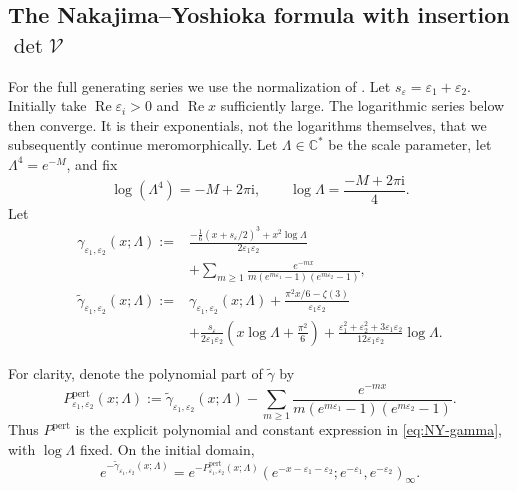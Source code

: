 \documentclass{amsart}
\theoremstyle{definition}
\numberwithin{equation}{section}
\newcommand{\C}{\mathbb C}
\newcommand{\eps}{\varepsilon}
\begin{document}
\subsection{The Nakajima--Yoshioka formula with insertion \texorpdfstring{\(\det\mathcal V\)}{det V}}
\label{subsec:NY-P2-level-one}
For the full generating series we use the normalization of \cite{NakajimaYoshiokaPerverse}.  Let \(s_\eps=\eps_1+\eps_2\).  Initially take \(\operatorname{Re}\eps_i>0\) and \(\operatorname{Re}x\) sufficiently large.  The logarithmic series below then converge.  It is their exponentials, not the logarithms themselves, that we subsequently continue meromorphically.  Let \(\Lambda\in\C^*\) be the scale parameter, let \(\Lambda^4=e^{-M}\), and fix
\begin{equation}
 \log(\Lambda^4)=-M+2\pi\mathrm{i},
 \qquad \log\Lambda=\frac{-M+2\pi\mathrm{i}}{4}.
\label{eq:Lambda-continuation-branch}
\end{equation}
Let
\begin{equation}
\begin{aligned}
 \gamma_{\eps_1,\eps_2}(x;\Lambda)
 :={}&
 \frac{-\frac16(x+s_\eps/2)^3+x^2\log\Lambda}
 {2\eps_1\eps_2}\\
 &+\sum_{m\geq1}
 \frac{e^{-mx}}
 {m(e^{m\eps_1}-1)(e^{m\eps_2}-1)},\\
 \widetilde\gamma_{\eps_1,\eps_2}(x;\Lambda)
 :={}&\gamma_{\eps_1,\eps_2}(x;\Lambda)
 +\frac{\pi^2x/6-\zeta(3)}{\eps_1\eps_2}\\
 &+\frac{s_\eps}{2\eps_1\eps_2}
 \left(x\log\Lambda+\frac{\pi^2}{6}\right)
 +\frac{\eps_1^2+\eps_2^2+3\eps_1\eps_2}
 {12\eps_1\eps_2}\log\Lambda.
\end{aligned}
\label{eq:NY-gamma}
\end{equation}

For clarity, denote the polynomial part of \(\widetilde\gamma\) by
\[
 P^{\mathrm{pert}}_{\eps_1,\eps_2}(x;\Lambda)
 :=\widetilde\gamma_{\eps_1,\eps_2}(x;\Lambda)
 -\sum_{m\geq1}\frac{e^{-mx}}
 {m(e^{m\eps_1}-1)(e^{m\eps_2}-1)}.
\]
Thus \(P^{\mathrm{pert}}\) is the explicit polynomial and constant expression in \eqref{eq:NY-gamma}, with \(\log\Lambda\) fixed.  On the initial domain,
\begin{equation}
 e^{-\widetilde\gamma_{\eps_1,\eps_2}(x;\Lambda)}
 =e^{-P^{\mathrm{pert}}_{\eps_1,\eps_2}(x;\Lambda)}
 (e^{-x-\eps_1-\eps_2};e^{-\eps_1},e^{-\eps_2})_\infty.
\label{eq:NY-exponentiated-gamma}
\end{equation}
\end{document}
